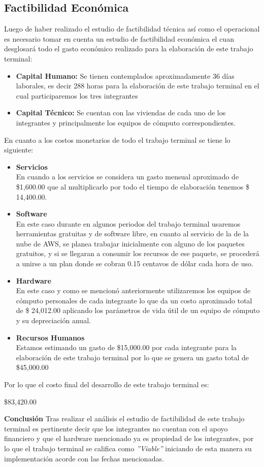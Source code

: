 \documentclass[12pt, a4paper, titlepage]{report}
\begin{document}
    	\subsection{Factibilidad Económica}
    	Luego de haber realizado el estudio de factibilidad técnica así como el operacional es necesario tomar en cuenta un estudio de factibilidad económica el cuan desglosará todo el gasto económico realizado para la elaboración de este trabajo terminal:
    	\begin{itemize}
    		\item \textbf{Capital Humano:} Se tienen contemplados aproximadamente 36 días laborales, es decir 288 horas para la elaboración de este trabajo terminal en el cual participaremos los tres integrantes
    		\item \textbf{Capital Técnico:} Se cuentan con las viviendas de cada uno de los integrantes y principalmente los equipos de cómputo correspondientes.
    	\end{itemize}
    	En cuanto a los costos monetarios de todo el trabajo terminal se tiene lo siguiente:
    	\begin{itemize}
    		\item \textbf{Servicios}\\
    		En cuando a los servicios se considera un gasto mensual aproximado de \$1,600.00 que al multiplicarlo por todo el tiempo de elaboración tenemos \$ 14,400.00.
    		\item \textbf{Software} \\
    		En este caso durante en algunos periodos del trabajo terminal usaremos herramientas gratuitas y de software libre, en cuanto al servicio de la de la nube de AWS, se planea trabajar inicialmente con alguno de los paquetes gratuitos, y si se llegaran a consumir los recursos de ese paquete, se procederá a unirse a un plan donde se cobran 0.15 centavos de dólar cada hora de uso.
    		\item \textbf{Hardware}\\
    		En este caso y como se mencionó anteriormente utilizaremos los equipos de cómputo personales de cada integrante lo que da un costo aproximado total de \$ 24,012.00 aplicando los parámetros de vida útil de un equipo de cómputo y su depreciación anual. 
    		\item \textbf{Recursos Humanos}\\
    		Estamos estimando un gasto de \$15,000.00 por cada integrante para la elaboración de este trabajo terminal por lo que se genera un gasto total de \$45,000.00
    	\end{itemize}
    	Por lo que el costo final del desarrollo de este trabajo terminal es: \\
    	\begin{center}
    		\$83,420.00
    	\end{center}
    	\textbf{Conclusión} 
    	Tras realizar el análisis el estudio de factibilidad de este trabajo terminal es pertinente decir que los integrantes no cuentan con el apoyo financiero y que el hardware mencionado ya es propiedad de los integrantes, por lo que el trabajo terminal se califica como \textit{''Viable''} iniciando de esta manera su implementación acorde con las fechas mencionadas.
    	    
\end{document}
